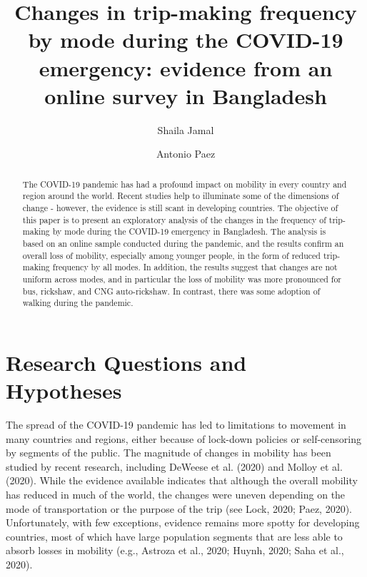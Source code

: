 \documentclass[]{elsarticle} %
\begin{document}
\begin{frontmatter}

  \title{Changes in trip-making frequency by mode during the COVID-19 emergency:
evidence from an online survey in Bangladesh}
    \author[McMaster University]{Shaila Jamal}
    \author[McMaster University]{Antonio Paez}
      \address[McMaster University]{School of Earth, Environment and Society, McMaster University, Hamilton,
ON, L8S 4K1, Canada}
  
  \begin{abstract}
  The COVID-19 pandemic has had a profound impact on mobility in every
  country and region around the world. Recent studies help to illuminate
  some of the dimensions of change - however, the evidence is still scant
  in developing countries. The objective of this paper is to present an
  exploratory analysis of the changes in the frequency of trip-making by
  mode during the COVID-19 emergency in Bangladesh. The analysis is based
  on an online sample conducted during the pandemic, and the results
  confirm an overall loss of mobility, especially among younger people, in
  the form of reduced trip-making frequency by all modes. In addition, the
  results suggest that changes are not uniform across modes, and in
  particular the loss of mobility was more pronounced for bus, rickshaw,
  and CNG auto-rickshaw. In contrast, there was some adoption of walking
  during the pandemic.
  \end{abstract}
  
 \end{frontmatter}

\hypertarget{research-questions-and-hypotheses}{%
\section{Research Questions and
Hypotheses}\label{research-questions-and-hypotheses}}

The spread of the COVID-19 pandemic has led to limitations to movement
in many countries and regions, either because of lock-down policies or
self-censoring by segments of the public. The magnitude of changes in
mobility has been studied by recent research, including DeWeese et al.
(2020) and Molloy et al. (2020). While the evidence available indicates
that although the overall mobility has reduced in much of the world, the
changes were uneven depending on the mode of transportation or the
purpose of the trip (see Lock, 2020; Paez, 2020). Unfortunately, with
few exceptions, evidence remains more spotty for developing countries,
most of which have large population segments that are less able to
absorb losses in mobility (e.g., Astroza et al., 2020; Huynh, 2020; Saha
et al., 2020).
\end{document}
